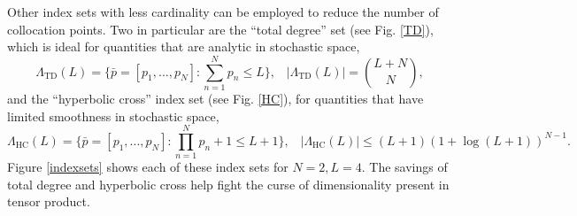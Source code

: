 \documentclass[11pt]{article}
\begin{document}
Other index sets with less cardinality can be employed to reduce the number of collocation points.  Two in particular are the ``total degree'' set (see Fig. \ref{TD}), which is ideal for quantities that are analytic in stochastic space,
\begin{equation}
\Lambda_\text{TD}(L)=\Big\{\bar p=[p_1,...,p_N]:\sum_{n=1}^N p_n \leq L \Big\},\hspace{10pt}|\Lambda_\text{TD}(L)|={L+N\choose N},
\end{equation}
and the ``hyperbolic cross'' index set (see Fig. \ref{HC}), for quantities that have limited smoothness in stochastic space,
\begin{equation}
\Lambda_\text{HC}(L)=\Big\{\bar p=[p_1,...,p_N]:\prod_{n=1}^N p_n+1 \leq L+1 \Big\},\hspace{10pt}|\Lambda_\text{HC}(L)|\leq (L+1)(1+\log(L+1))^{N-1}.
\end{equation}
Figure \ref{indexsets} shows each of these index sets for $N=2,L=4$.  The savings of total degree and hyperbolic cross help fight the curse of dimensionality present in tensor product. 
\end{document}

